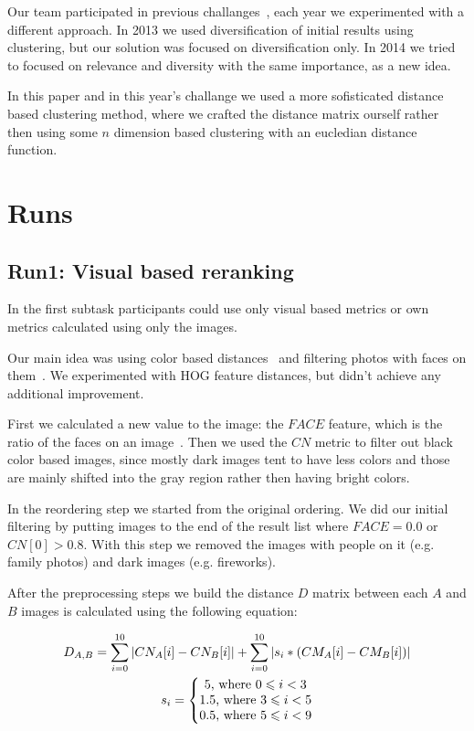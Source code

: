 \documentclass{sig-alternate}
\begin{document}
Our team participated in previous challanges~\cite{szHucs2013bmemtm,Paroczi2014}, each year we experimented with a different approach. In 2013 we used diversification of initial results using clustering, but our solution was focused on diversification only. In 2014 we tried to focused on relevance and diversity with the same importance, as a new idea.

In this paper and in this year's challange we used a more sofisticated distance based clustering method, where we crafted the distance matrix ourself rather then using some $n$ dimension based clustering with an eucledian distance function. 

\section{Runs}

\subsection{Run1: Visual based reranking}
In the first subtask participants could use only visual based metrics or own metrics calculated using only the images.

Our main idea was using color based distances~\cite{Datta2008,Paramita2010} and filtering photos with faces on them~\cite{szHucs2013bmemtm,Paroczi2014}. We experimented with HOG feature distances, but didn't achieve any additional improvement.

First we calculated a new value to the image: the $FACE$ feature, which is the ratio of the faces on an image~\cite{szHucs2013bmemtm}. Then we used the $CN$ metric to filter out black color based images, since mostly dark images tent to have less colors and those are mainly shifted into the gray region rather then having bright colors. 

In the reordering step we started from the original ordering. We did our initial filtering by putting images to the end of the result list where $FACE=0.0$ or $CN[0]>0.8$. With this step we removed the images with people on it (e.g. family photos) and dark images (e.g. fireworks). 

After the preprocessing steps we build the distance $D$ matrix between each $A$ and $B$ images is calculated using the following equation:

\begin{gather*} 
D_{A,B} = \sum_{i=0}^{10}  \left | CN_{A}[i]-CN_{B}[i] \right | +\sum_{i=0}^{10} \left | s_i * (CM_{A}[i]-CM_{B}[i]) \right |\\
s_i = \left\{\begin{matrix}
5 \textup{, where }0 \leqslant  i < 3\\ 
1.5 \textup{, where }3 \leqslant  i < 5\\ 
0.5 \textup{, where }5 \leqslant  i < 9
\end{matrix}\right.
\end{gather*}
\end{document}
